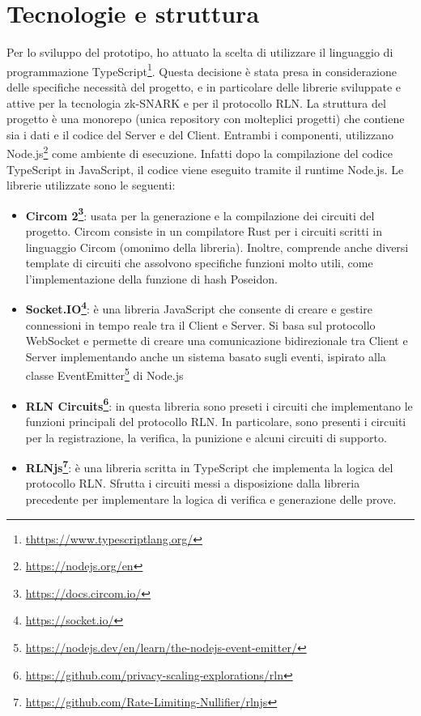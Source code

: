 \section{Tecnologie e struttura}
Per lo sviluppo del prototipo, ho attuato la scelta di utilizzare il linguaggio di programmazione
TypeScript\footnote{\url{thttps://www.typescriptlang.org/}}. Questa decisione è stata presa in considerazione delle
specifiche necessità del progetto, e in particolare delle librerie sviluppate e attive per la tecnologia zk-SNARK e per
il protocollo RLN. La struttura del progetto è una monorepo (unica repository con molteplici progetti) che contiene sia
i dati e il codice del Server e del Client. Entrambi i componenti, utilizzano
Node.js\footnote{\url{https://nodejs.org/en}} come ambiente di esecuzione. Infatti dopo la compilazione del codice
TypeScript in JavaScript, il codice viene eseguito tramite il runtime Node.js. Le librerie utilizzate sono le seguenti:
\begin{itemize}
    \item \textbf{Circom 2\footnote{\url{https://docs.circom.io/}}}: usata per la generazione e la compilazione dei
    circuiti del progetto. Circom consiste in un compilatore Rust per i circuiti scritti in linguaggio Circom (omonimo
    della libreria). Inoltre, comprende anche diversi template di circuiti che assolvono specifiche funzioni molto utili,
    come l'implementazione della funzione di hash Poseidon.
    \item \textbf{Socket.IO\footnote{\url{https://socket.io/}}}: è una libreria JavaScript che consente di creare e
    gestire connessioni in tempo reale tra il Client e Server. Si basa sul protocollo WebSocket e permette di creare una
    comunicazione bidirezionale tra Client e Server implementando anche un sistema basato sugli eventi, ispirato alla
    classe EventEmitter\footnote{\url{https://nodejs.dev/en/learn/the-nodejs-event-emitter/}} di Node.js
    \item \textbf{RLN Circuits\footnote{\url{https://github.com/privacy-scaling-explorations/rln}}}: in questa libreria
    sono preseti i circuiti che implementano le funzioni principali del protocollo RLN. In particolare, sono presenti i
    circuiti per la registrazione, la verifica, la punizione e alcuni circuiti di supporto.
    \item \textbf{RLNjs\footnote{\url{https://github.com/Rate-Limiting-Nullifier/rlnjs}}}: è una libreria scritta in
    TypeScript che implementa la logica del protocollo RLN. Sfrutta i circuiti messi a disposizione dalla libreria
    precedente per implementare la logica di verifica e generazione delle prove.
\end{itemize}

